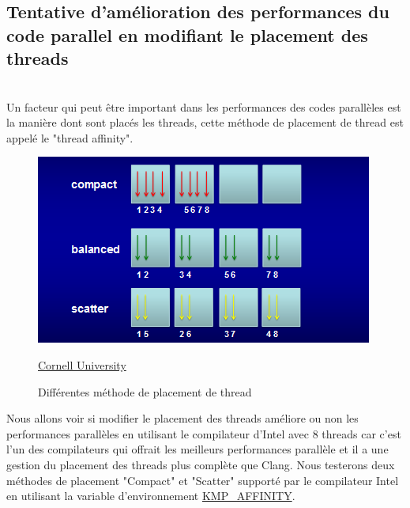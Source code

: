 \documentclass[
 aip,
 jmp,
 amsmath,amssymb,
 reprint
]{revtex4-1}
\begin{document}
\subsection{Tentative d'amélioration des performances du code parallel en modifiant le placement des threads}\mbox{}\\

Un facteur qui peut être important dans les performances des codes parallèles est la manière dont sont placés les threads, cette méthode de placement de thread est appelé le "thread affinity".

\begin{figure}[H]
  \includegraphics[width=\linewidth, keepaspectratio=true]{affinity.png}
  \centering
  \caption{Différentes méthode de placement de thread \label{Fig:affinity}}{\href{https://cvw.cac.cornell.edu/mic/affinity}{Cornell University}}
\end{figure}

Nous allons voir si modifier le placement des threads améliore ou non les performances parallèles en utilisant le compilateur d'Intel avec 8 threads car c'est l'un des compilateurs qui offrait les meilleurs performances parallèle et il a une gestion du placement des threads plus complète que Clang. Nous testerons deux méthodes de placement "Compact" et "Scatter" supporté par le compilateur Intel en utilisant la variable d'environnement \href{https://software.intel.com/en-us/node/522691}{KMP\_AFFINITY}.
\end{document}
